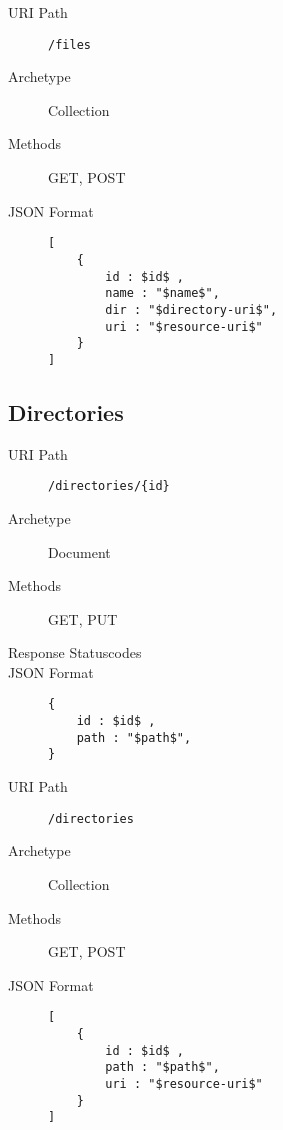 \documentclass[10pt,a4paper]{scrartcl}
\begin{document}
\begin{mdframed}[style=def]
\begin{description}
	\item[URI Path] \texttt{/files}
	\item[Archetype] Collection
	\item[Methods] GET, POST
	\item[JSON Format] \hfill
\begin{lstlisting}
[
    {
    	id : $id$ ,
    	name : "$name$",
    	dir : "$directory-uri$",
    	uri : "$resource-uri$"
    }
]
\end{lstlisting}
\end{description}
\end{mdframed}


\pagebreak
\subsection{Directories}

\begin{mdframed}[style=def]
\begin{description}
	\item[URI Path] \texttt{/directories/\{id\}}
	\item[Archetype] Document
	\item[Methods] GET, PUT
	\item[Response Statuscodes] \hfill
	\item[JSON Format] \hfill
\begin{lstlisting}
{
	id : $id$ ,
	path : "$path$",
}
\end{lstlisting}
\end{description}
\end{mdframed}

\begin{mdframed}[style=def]
\begin{description}
	\item[URI Path] \texttt{/directories}
	\item[Archetype] Collection
	\item[Methods] GET, POST
	\item[JSON Format] \hfill
\begin{lstlisting}
[
    {
    	id : $id$ ,
    	path : "$path$",
    	uri : "$resource-uri$"
    }
]
\end{lstlisting}
\end{description}
\end{mdframed}
\end{document}
